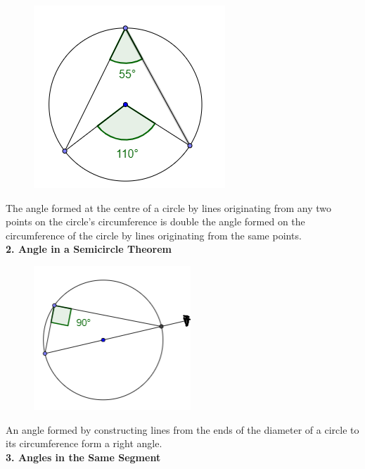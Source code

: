         \begin{figure} [hbt!]
            \centering
            \includegraphics[scale=0.6]{Resources/Unit4Circles/circle1.PNG}
        \end{figure}

        \noindent The angle formed at the centre of a circle by lines originating from any two
        points on the circle's circumference is double the angle formed on the circumference of
        the circle by lines originating from the same points. \\

        \pagebreak
        \noindent \color{purple} \textbf{2. Angle in a Semicircle Theorem} \color{black} \\
        \begin{figure} [hbt!]
            \centering
            \includegraphics[scale=0.75]{Resources/Unit4Circles/circle2.PNG}
        \end{figure}

        \noindent An angle formed by constructing lines from the ends of the diameter of a circle
        to its circumference form a right angle. \\

        \noindent \color{purple} \textbf{3. Angles in the Same Segment} \color{black} \\

